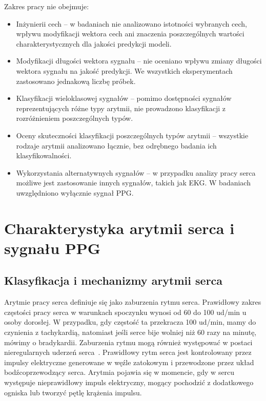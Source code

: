 \documentclass[a4paper,twoside,12pt]{book}
\begin{document}
Zakres pracy nie obejmuje:
\begin{itemize}
	\item Inżynierii cech -- w badaniach nie analizowano istotności wybranych cech, wpływu modyfikacji wektora cech ani znaczenia poszczególnych wartości charakterystycznych dla jakości predykcji modeli.
	\item Modyfikacji długości wektora sygnału -- nie oceniano wpływu zmiany długości wektora sygnału na jakość predykcji. We wszystkich eksperymentach zastosowano jednakową liczbę próbek.
	\item Klasyfikacji wieloklasowej sygnałów -- pomimo dostępności sygnałów reprezentujących różne typy arytmii, nie prowadzono klasyfikacji z rozróżnieniem poszczególnych typów.
	\item Oceny skuteczności klasyfikacji poszczególnych typów arytmii -- wszystkie rodzaje arytmii analizowano łącznie, bez odrębnego badania ich klasyfikowalności.
	\item Wykorzystania alternatywnych sygnałów -- w przypadku analizy pracy serca możliwe jest zastosowanie innych sygnałów, takich jak EKG. W badaniach uwzględniono wyłącznie sygnał PPG.
\end{itemize}



\chapter{Charakterystyka arytmii serca i sygnału PPG}
\section{Klasyfikacja i mechanizmy arytmii serca}
Arytmie pracy serca definiuje się jako zaburzenia rytmu serca. Prawidłowy zakres częstości pracy serca w warunkach spoczynku wynosi od 60 do 100 ud/min u osoby dorosłej. W przypadku, gdy częstość ta przekracza 100 ud/min, mamy do czynienia z tachykardią, natomiast jeśli serce bije wolniej niż 60 razy na minutę, mówimy o bradykardii. Zaburzenia rytmu mogą również występować w postaci nieregularnych uderzeń serca~\cite{Makos2021}. Prawidłowy rytm serca jest kontrolowany przez impulsy elektryczne generowane w węźle zatokowym i przewodzone przez układ bodźcoprzewodzący serca. Arytmia pojawia się w momencie, gdy w sercu występuje nieprawidłowy impuls elektryczny, mogący pochodzić z dodatkowego ogniska lub tworzyć pętlę krążenia impulsu.
\end{document}
